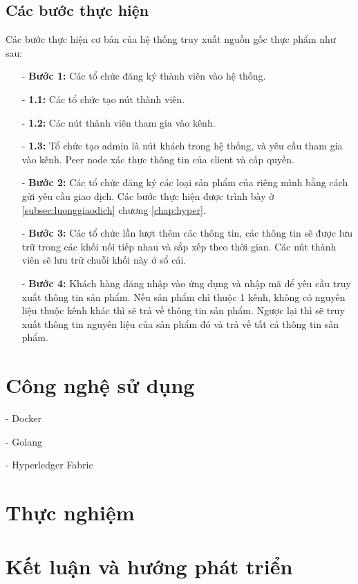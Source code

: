 \subsection{Các bước thực hiện}
Các bước thực hiện cơ bản của hệ thống truy xuất nguồn gốc thực phẩm như sau:
\begin{itemize}
    \item[-] \textbf{Bước 1:} Các tổ chức đăng ký thành viên vào hệ thống.
        \item[-] \textbf{1.1:} Các tổ chức tạo nút thành viên. 
        \item[-] \textbf{1.2:} Các nút thành viên tham gia vào kênh.
        \item[-] \textbf{1.3:} Tổ chức tạo admin là nút khách trong hệ thống, và yêu cầu
        tham gia vào kênh. Peer node xác thực thông tin của client và cấp quyền.
    \item[-] \textbf{Bước 2:} Các tổ chức đăng ký các loại sản phẩm của riêng mình bằng cách 
    gửi yêu cầu giao dịch. Các bước thực hiện được trình bày ở \ref{subsec:luonggiaodich} chương \ref{chap:hyper}.
    \item[-] \textbf{Bước 3:} Các tổ chức lần lượt thêm các thông tin, các thông tin sẽ được
    lưu trữ trong các khối nối tiếp nhau và sắp xếp theo thời gian. Các nút thành viên sẽ lưu 
    trữ chuỗi khối này ở sổ cái.
    \item[-] \textbf{Bước 4:} Khách hàng đăng nhập vào ứng dụng và nhập mã để yêu cầu truy xuất
    thông tin sản phẩm. Nếu sản phẩm chỉ thuộc 1 kênh, không có nguyên liệu thuộc kênh
    khác thì sẽ trả về thông tin sản phẩm. Ngược lại thì sẽ truy xuất thông tin nguyên liệu
    của sản phẩm đó và trả về tất cả thông tin sản phẩm.
\end{itemize}


\section{Công nghệ sử dụng}
- Docker

- Golang

- Hyperledger Fabric

\section{Thực nghiệm}

\section{Kết luận và hướng phát triển}